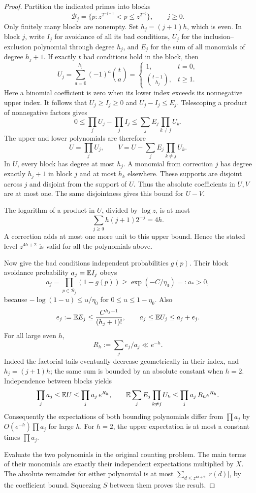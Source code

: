 \begin{proof}
Partition the indicated primes into blocks
\[
 \mathcal B_j=\{p:z^{2^{-j-1}}<p\le z^{2^{-j}}\},\qquad j\ge0.
\]
Only finitely many blocks are nonempty. Set $h_j=(j+1)h$, which is
even. In block $j$, write $I_j$ for avoidance of all its bad conditions,
$U_j$ for the inclusion--exclusion polynomial through degree $h_j$,
and $E_j$ for the sum of all monomials of degree $h_j+1$.
If exactly $t$ bad conditions hold in the block, then
\[
 U_j=\sum_{a=0}^{h_j}(-1)^a\binom ta
 =\begin{cases}
  1,&t=0,\\
  \binom{t-1}{h_j},&t\ge1.
 \end{cases}
\]
Here a binomial coefficient is zero when its lower index exceeds
its nonnegative upper index. It follows that $U_j\ge I_j\ge0$ and
$U_j-I_j\le E_j$. Telescoping a product of nonnegative factors gives
\[
 0\le\prod_jU_j-\prod_jI_j
 \le\sum_jE_j\prod_{k\ne j}U_k.
\]
The upper and lower polynomials are therefore
\begin{equation}\label{eq:sieve-polynomials}
 U=\prod_jU_j,\qquad
 V=U-\sum_jE_j\prod_{k\ne j}U_k.
\end{equation}
In $U$, every block has degree at most $h_j$. A monomial from
correction $j$ has degree exactly $h_j+1$ in block $j$ and at most
$h_k$ elsewhere. These supports are disjoint across $j$ and disjoint
from the support of $U$. Thus the absolute coefficients in $U,V$
are at most one. The same disjointness gives this bound for $U-V$.

The logarithm of a product in $U$, divided by $\log z$, is at most
\[
 \sum_{j\ge0}h(j+1)2^{-j}=4h.
\]
A correction adds at most one more unit to this upper bound. Hence
the stated level $z^{4h+2}$ is valid for all the polynomials above.

Now give the bad conditions independent probabilities $g(p)$.
Their block avoidance probability $a_j=\mathbb E I_j$ obeys
\[
 a_j=\prod_{p\in\mathcal B_j}(1-g(p))
 \ge\exp(-C/\eta_0)=:a_*>0,
\]
because $-\log(1-u)\le u/\eta_0$ for $0\le u\le1-\eta_0$.
Also
\[
 e_j:=\mathbb E E_j\le\frac{C^{h_j+1}}{(h_j+1)!},\qquad
 a_j\le\mathbb E U_j\le a_j+e_j.
\]
For all large even $h$,
\[
 R_h:=\sum_j e_j/a_j\ll e^{-h}.
\]
Indeed the factorial tails eventually decrease geometrically in
their index, and $h_j=(j+1)h$; the same sum is bounded by an absolute
constant when $h=2$. Independence between blocks yields
\[
 \prod_ja_j\le\mathbb E U\le\prod_ja_j\,e^{R_h},
 \qquad
 \mathbb E\sum_jE_j\prod_{k\ne j}U_k
 \le\prod_ja_j\,R_he^{R_h}.
\]
Consequently the expectations of both bounding polynomials differ
from $\prod a_j$ by $O(e^{-h})\prod a_j$ for large $h$.
For $h=2$, the upper expectation is at most a constant times
$\prod a_j$.

Evaluate the two polynomials in the original counting problem.
The main terms of their monomials are exactly their independent
expectations multiplied by $X$. The absolute remainder for either
polynomial is at most $\sum_{d\le z^{4h+2}}|r(d)|$, by the coefficient
bound. Squeezing $S$ between them proves the result.
\end{proof}

